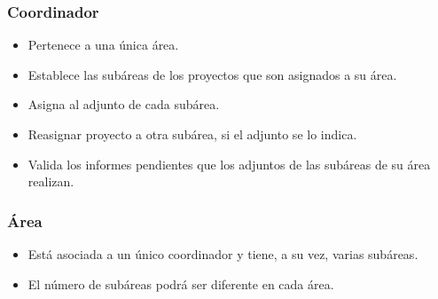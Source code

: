 \documentclass[12pt,a4paper,spanish,twoside]{article}
\begin{document}
\subsubsection{Coordinador}
\begin{itemize}
\item Pertenece a una única área.
\item Establece las subáreas de los proyectos que son asignados a su área.
\item Asigna al adjunto de cada subárea.
\item Reasignar proyecto a otra subárea, si el adjunto se lo indica.
\item Valida los informes pendientes que los adjuntos de las subáreas de su
  área realizan.
\end{itemize}

\subsubsection{Área}
\begin{itemize}
\item Está asociada a un único coordinador y tiene, a su vez, varias subáreas. 
\item El número de subáreas podrá ser diferente en cada área.
\end{itemize}
\end{document}
